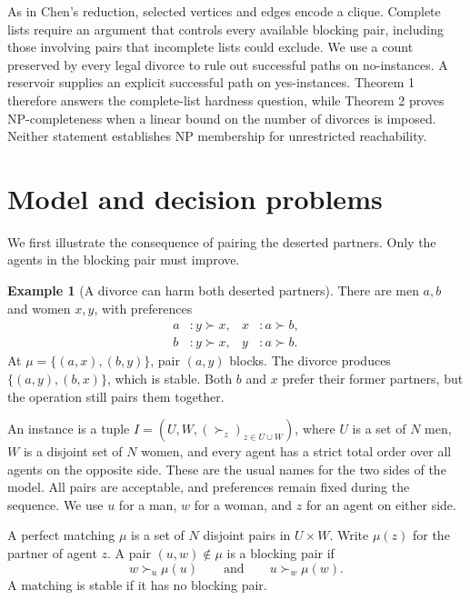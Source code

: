 \documentclass[11pt,letterpaper]{article}
\theoremstyle{definition}
\newtheorem{example}{Example}
\begin{document}
As in Chen's reduction, selected vertices and edges encode a clique. Complete lists require an argument that controls every available blocking pair, including those involving pairs that incomplete lists could exclude. We use a count preserved by every legal divorce to rule out successful paths on no-instances. A reservoir supplies an explicit successful path on yes-instances. Theorem 1 therefore answers the complete-list hardness question, while Theorem 2 proves NP-completeness when a linear bound on the number of divorces is imposed. Neither statement establishes NP membership for unrestricted reachability.

\section{Model and decision problems}

We first illustrate the consequence of pairing the deserted partners. Only the agents in the blocking pair must improve.

\begin{example}[A divorce can harm both deserted partners]
There are men $a,b$ and women $x,y$, with preferences
\[
\begin{aligned}
a &: y\succ x, & x &: a\succ b,\\
b &: y\succ x, & y &: a\succ b.
\end{aligned}
\]
At $\mu=\{(a,x),(b,y)\}$, pair $(a,y)$ blocks. The divorce produces $\{(a,y),(b,x)\}$, which is stable. Both $b$ and $x$ prefer their former partners, but the operation still pairs them together.
\end{example}

An instance is a tuple $I=(U,W,(\succ_z)_{z\in U\cup W})$, where $U$ is a set of $N$ men, $W$ is a disjoint set of $N$ women, and every agent has a strict total order over all agents on the opposite side. These are the usual names for the two sides of the model. All pairs are acceptable, and preferences remain fixed during the sequence. We use $u$ for a man, $w$ for a woman, and $z$ for an agent on either side.

A perfect matching $\mu$ is a set of $N$ disjoint pairs in $U\times W$. Write $\mu(z)$ for the partner of agent $z$. A pair $(u,w)\notin\mu$ is a blocking pair if
\begin{equation}\tag{1}
w\succ_u\mu(u)\qquad\text{and}\qquad u\succ_w\mu(w).
\end{equation}
A matching is stable if it has no blocking pair.
\end{document}
